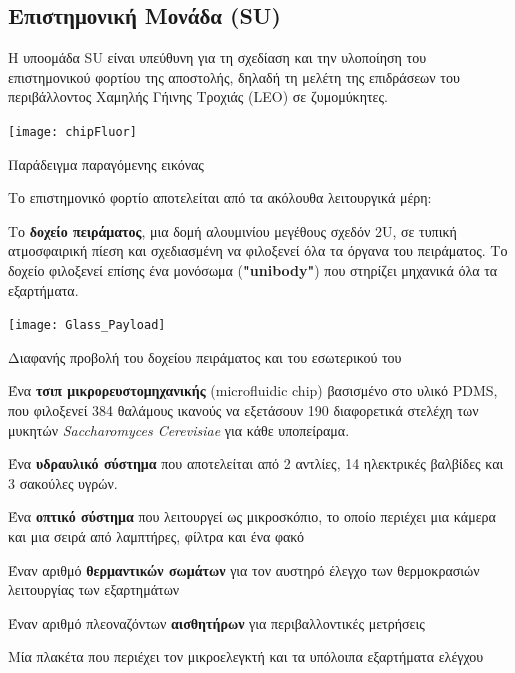 \documentclass[a4paper,nobib]{tufte-book}
\begin{document}
\subsection{Επιστημονική Μονάδα (\acs{SU})}

Η υποομάδα \acl{SU} είναι υπεύθυνη για τη σχεδίαση και την υλοποίηση του επιστημονικού φορτίου της αποστολής, δηλαδή τη μελέτη της επιδράσεων του περιβάλλοντος Χαμηλής Γήινης Τροχιάς (\ac{LEO}) σε ζυμομύκητες.

\begin{marginfigure}
	\texttt{[image: chipFluor]}
	\caption[Παράδειγμα παραγόμενης εικόνας]{Παράδειγμα παραγόμενης εικόνας \parencite{DDJF_PL}}
	\label{fig:chip_fluor}
\end{marginfigure}

Το επιστημονικό φορτίο αποτελείται από τα ακόλουθα λειτουργικά μέρη: \autocite{DDJF_PL}
\begin{compactitem}
	\item Το \textbf{δοχείο πειράματος}, μια δομή αλουμινίου μεγέθους σχεδόν 2U, σε τυπική ατμοσφαιρική πίεση και σχεδιασμένη να φιλοξενεί όλα τα όργανα του πειράματος. Το δοχείο φιλοξενεί επίσης ένα μονόσωμα (\textbf{"unibody"}) που στηρίζει μηχανικά όλα τα εξαρτήματα.
	\begin{marginfigure}
		\centering
		\texttt{[image: Glass\_Payload]}
		\caption{Διαφανής προβολή του δοχείου πειράματος και του εσωτερικού του}
		\label{fig:container}
	\end{marginfigure}
	\item Ένα \textbf{τσιπ μικρορευστομηχανικής} (microfluidic chip) βασισμένο στο υλικό \acs{PDMS}, που φιλοξενεί 384 θαλάμους ικανούς να εξετάσουν 190 διαφορετικά στελέχη των μυκητών \emph{Saccharomyces Cerevisiae} για κάθε υποπείραμα.
	\item Ένα \textbf{υδραυλικό σύστημα} που αποτελείται από 2 αντλίες, 14 ηλεκτρικές βαλβίδες και 3 σακούλες υγρών.
	\item Ένα \textbf{οπτικό σύστημα} που λειτουργεί ως μικροσκόπιο, το οποίο περιέχει μια κάμερα και μια σειρά από λαμπτήρες, φίλτρα και ένα φακό
	\item Έναν αριθμό \textbf{θερμαντικών σωμάτων} για τον αυστηρό έλεγχο των θερμοκρασιών λειτουργίας των εξαρτημάτων
	\item Έναν αριθμό πλεοναζόντων \textbf{αισθητήρων} για περιβαλλοντικές μετρήσεις
	\item Μία πλακέτα που περιέχει τον μικροελεγκτή και τα υπόλοιπα εξαρτήματα ελέγχου
\end{compactitem}
\end{document}
